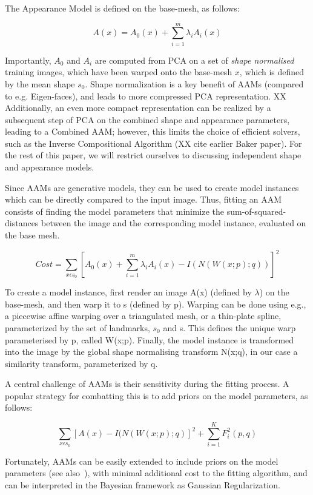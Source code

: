 \documentclass[10pt,twocolumn,letterpaper]{article}
\begin{document}
The Appearance Model is defined on the base-mesh, as follows:

\[A(x) = A_0(x) + \sum_{i=1}^m \lambda_i A_i(x)\]

Importantly, $A_0$ and $A_i$ are computed from PCA on a set of \emph{shape normalised} training images, which have been warped onto the base-mesh $x$, which is defined by the mean shape $s_0$.  Shape normalization is a key benefit of AAMs (compared to e.g. Eigen-faces), and leads to more compressed PCA representation.  XX Additionally, an even more compact representation can be realized by a subsequent step of PCA on the combined shape and appearance parameters, leading to a Combined AAM; however, this limits the choice of efficient solvers, such as the Inverse Compositional Algorithm (XX cite earlier Baker paper).  For the rest of this paper, we will restrict ourselves to discussing independent shape and appearance models.

Since AAMs are generative models, they can be used to create model instances which can be directly compared to the input image.  Thus, fitting an AAM consists of finding the model parameters that minimize the sum-of-squared-distances between the image and the corresponding model instance, evaluated on the base mesh.

\[Cost = \sum_{x \epsilon s_0} [A_0(x) + \sum_{i=1}^m \lambda_i A_i(x) - I(N(W(x;p);q))]^2 \]

To create a model instance, first render an image A(x) (defined by $\lambda$) on the base-mesh, and then warp it to s (defined by p).  Warping can be done using e.g., a piecewise affine warping over a triangulated mesh, or a thin-plate spline, parameterized by the set of landmarks, $s_0$ and s.  This defines the unique warp parameterised by p, called W(x;p).  Finally, the model instance is transformed into the image by the global shape normalising transform N(x;q), in our case a similarity transform, parameterized by q.

A central challenge of AAMs is their sensitivity during the fitting process.  A popular strategy for combatting this is to add priors on the model parameters, as follows:

\[ \sum_{x \epsilon s_0} [A(x) - I(N(W(x;p);q)]^2 + \sum_{i=1}^K F_i^2(p,q) \]

Fortunately, AAMs can be easily extended to include priors on the model parameters (see also~\cite{BakerAAM2004}), with minimal additional cost to the fitting algorithm, and can be interpreted in the Bayesian framework as Gaussian Regularization.
\end{document}
